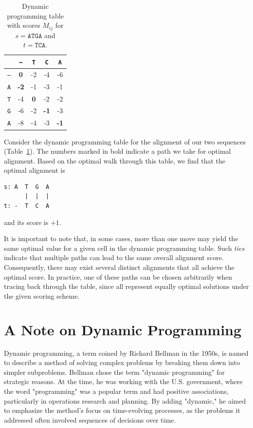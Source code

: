 \begin{table}[h!]
\centering
\caption{Dynamic programming table with scores $M_{ij}$ for $s=\texttt{ATGA}$ and $t=\texttt{TCA}$.}
\label{t:dpt}
\begin{tabular}{c|cccc}
\hline
 & \texttt{–} & \texttt{T} & \texttt{C} & \texttt{A} \\
\hline
\texttt{–} & \textbf{0}  & -2 & -4 & -6 \\
\texttt{A} & \textbf{-2} & -1 & -3 & -1 \\
\texttt{T} & -4 & \textbf{0} & -2 & -2 \\
\texttt{G} & -6 & -2 & \textbf{-1} & -3 \\
\texttt{A} & -8 & -4 & -3 & \textbf{-1} \\
\hline
\end{tabular}
\end{table}

Consider the dynamic programming table for the alignment of our two sequences (Table~\ref{t:dpt}). The numbers marked in bold indicate a path we take for optimal alignment. Based on the optimal walk through this table, we find that the optimal alignment is
\begin{verbatim}
s: A  T  G  A
      |  |  |
t: -  T  C  A
\end{verbatim}
and its score is $+1$.

It is important to note that, in some cases, more than one move may yield the same optimal value for a given cell in the dynamic programming table. Such \emph{ties} indicate that multiple paths can lead to the same overall alignment score. Consequently, there may exist several distinct alignments that all achieve the optimal score. In practice, one of these paths can be chosen arbitrarily when tracing back through the table, since all represent equally optimal solutions under the given scoring scheme.

\section{A Note on Dynamic Programming}

Dynamic programming, a term coined by Richard Bellman in the 1950s,
 is named to describe a method of solving complex problems by breaking them down into simpler subproblems. Bellman chose the term "dynamic programming" for strategic reasons. At the time, he was working with the U.S. government, where the word "programming" was a popular term and had positive associations, particularly in operations research and planning. By adding "dynamic," he aimed to emphasize the method's focus on time-evolving processes, as the problems it addressed often involved sequences of decisions over time.

